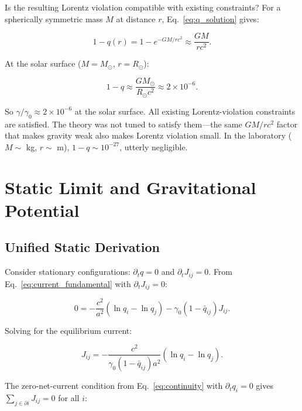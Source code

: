 \documentclass[aps,prd,twocolumn,showpacs,superscriptaddress,preprintnumbers]{revtex4-2}
\begin{document}
Is the resulting Lorentz violation compatible with existing constraints?
For a spherically symmetric mass $M$ at distance $r$, Eq.~\eqref{eq:q_solution} gives:

\begin{equation}
1 - q(r) = 1 - e^{-GM/rc^2} \approx \frac{GM}{rc^2}.
\label{eq:lv_estimate}
\end{equation}

At the solar surface ($M=M_\odot$, $r=R_\odot$):

\begin{equation}
1 - q \approx \frac{GM_\odot}{R_\odot c^2} \approx 2 \times 10^{-6}.
\label{eq:solar_lv}
\end{equation}

So $\gamma/\gamma_0 \approx 2\times 10^{-6}$ at the solar surface.
All existing Lorentz-violation constraints~\cite{Kostelecky:2008,Mewes:2013} are satisfied.
The theory was not tuned to satisfy them---the same $GM/rc^2$ factor that makes gravity weak also makes Lorentz violation small. In the laboratory ($M\sim$ kg, $r\sim$ m), $1-q\sim 10^{-27}$, utterly negligible.

\section{Static Limit and Gravitational Potential}
\label{sec:static}

\subsection{Unified Static Derivation}

Consider stationary configurations: $\partial_t q=0$ and $\partial_t J_{ij}=0$.
From Eq.~\eqref{eq:current_fundamental} with $\partial_t J_{ij}=0$:

\begin{equation}
0 = -\frac{c^2}{a^2}(\ln q_i - \ln q_j) - \gamma_0(1-\bar{q}_{ij})J_{ij}.
\label{eq:static_J_eq}
\end{equation}

Solving for the equilibrium current:

\begin{equation}
J_{ij} = -\frac{c^2}{\gamma_0(1-\bar{q}_{ij})a^2}(\ln q_i - \ln q_j).
\label{eq:J_static}
\end{equation}

The zero-net-current condition from Eq.~\eqref{eq:continuity} with $\partial_t q_i=0$ gives $\sum_{j\in\partial i}J_{ij}=0$ for all $i$:
\end{document}
